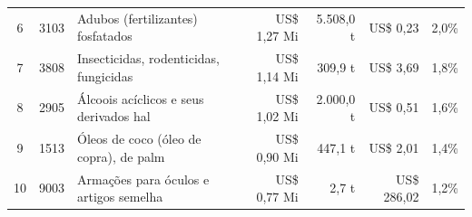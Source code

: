 \documentclass[10pt,a4paper]{article}
\begin{document}
\begin{minipage}[t]{0.482\textwidth}
\begin{minipage}{\linewidth}
{{\begin{tabular}{cclrrrr}
\rowcolor{corfundo} 6\textordmasculine{} & 3103 & Adubos (fertilizantes) fosfatados & US\$ 1,27 Mi & 5.508,0 t & US\$ 0,23 & 2,0\% \\
7\textordmasculine{} & 3808 & Insecticidas, rodenticidas, fungicidas & US\$ 1,14 Mi & 309,9 t & US\$ 3,69 & 1,8\% \\
\rowcolor{corfundo} 8\textordmasculine{} & 2905 & Álcoois acíclicos e seus derivados hal & US\$ 1,02 Mi & 2.000,0 t & US\$ 0,51 & 1,6\% \\
9\textordmasculine{} & 1513 & Óleos de coco (óleo de copra), de palm & US\$ 0,90 Mi & 447,1 t & US\$ 2,01 & 1,4\% \\
\rowcolor{corfundo} 10\textordmasculine{} & 9003 & Armações para óculos e artigos semelha & US\$ 0,77 Mi & 2,7 t & US\$ 286,02 & 1,2\% \\
\bottomrule
\end{tabular}%
}%
}
  \par{}
\end{minipage}
\par\vspace{0.08cm}
\end{minipage}
\par\vspace{0.08cm}
\end{document}
